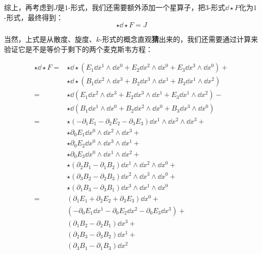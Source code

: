 综上，再考虑到$J$是$1$-形式，我们还需要额外添加一个星算子，把$3$-形式$\dd \star F$化为$1$-形式，最终得到：
\begin{equation}
    \star \dd \star F = J
\end{equation}

当然，上式是从散度、旋度、$k$-形式的概念直观\textbf{猜}出来的，我们还需要通过计算来验证它是不是等价于剩下的两个麦克斯韦方程：


\begin{equation}
    \begin{aligned}
        \star \dd \star F ={}& \star \dd \star (E_1\dd x^1\wedge \dd x^0 + E_2\dd x^2\wedge \dd x^0 + E_3\dd x^3\wedge \dd x^0)+\\
        & \star \dd \star (B_1\dd x^2\wedge \dd x^3+B_2\dd x^3\wedge \dd x^1 + B_3\dd x^1\wedge \dd x^2)\\
        ={}
        & \star \dd (E_1\dd x^2\wedge \dd x^3 + E_2\dd x^3\wedge \dd x^1 + E_3\dd x^1\wedge \dd x^2)-\\
        & \star \dd (B_1\dd x^1\wedge \dd x^0 + B_2\dd x^2\wedge \dd x^0 + B_3\dd x^3\wedge \dd x^0)\\
        ={}
        & \star (-\partial_1E_1-\partial_2E_2-\partial_3E_3)\dd x^1\wedge \dd x^2\wedge \dd x^3+\\
        & \star \partial_0E_1\dd x^0\wedge \dd x^2\wedge \dd x^3 +\\
        & \star \partial_0E_2\dd x^0\wedge \dd x^3\wedge \dd x^1 +\\
        & \star \partial_0E_3\dd x^0\wedge \dd x^1\wedge \dd x^2+\\
        & \star (\partial_2B_1-\partial_1B_2)\dd x^1\wedge \dd x^2 \wedge \dd x^0+\\
        & \star (\partial_3B_2-\partial_2B_3)\dd x^2\wedge \dd x^3 \wedge \dd x^0+\\
        & \star (\partial_1B_3-\partial_3B_1)\dd x^3\wedge \dd x^1 \wedge \dd x^0\\
        ={}
        & (\partial_1E_1+\partial_2E_2+\partial_3E_3)\dd x^0+\\
        & (-\partial_0 E_1\dd x^1-\partial_0 E_2\dd x^2-\partial_0 E_3\dd x^3)+\\
        & (\partial_1B_2-\partial_2B_1)\dd x^3+\\
        & (\partial_2B_3-\partial_3B_2)\dd x^1+\\
        & (\partial_3B_1-\partial_1B_3)\dd x^2
    \end{aligned}
\end{equation}

